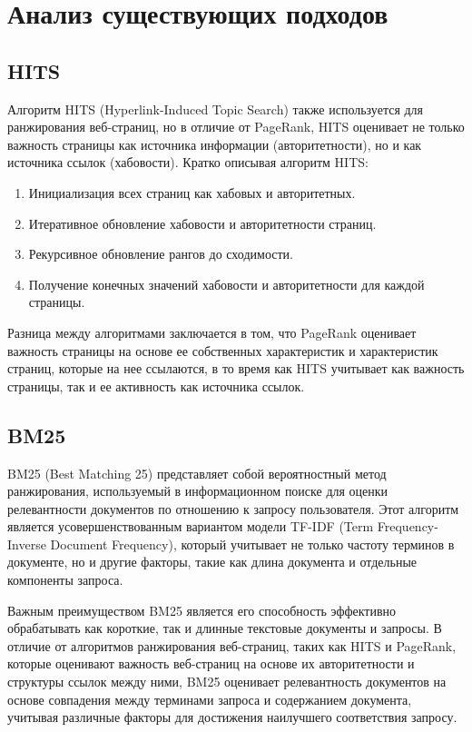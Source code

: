 \documentclass[a4paper]{article}
\begin{document}
	\section{Анализ существующих подходов}
	
	\subsection{HITS}
	
Алгоритм HITS (Hyperlink-Induced Topic Search) также используется для ранжирования веб-страниц, но в отличие от PageRank, HITS оценивает не только важность страницы как источника информации (авторитетности), но и как источника ссылок (хабовости). Кратко описывая алгоритм HITS:

\begin{enumerate}
	\item Инициализация всех страниц как хабовых и авторитетных.
	\item Итеративное обновление хабовости и авторитетности страниц.
	\item Рекурсивное обновление рангов до сходимости.
	\item Получение конечных значений хабовости и авторитетности для каждой страницы.
\end{enumerate}

Разница между алгоритмами заключается в том, что PageRank оценивает важность страницы на основе ее собственных характеристик и характеристик страниц, которые на нее ссылаются, в то время как HITS учитывает как важность страницы, так и ее активность как источника ссылок.

	\subsection{BM25}
	
BM25 (Best Matching 25) представляет собой вероятностный метод ранжирования, используемый в информационном поиске для оценки релевантности документов по отношению к запросу пользователя. Этот алгоритм является усовершенствованным вариантом модели TF-IDF (Term Frequency-Inverse Document Frequency), который учитывает не только частоту терминов в документе, но и другие факторы, такие как длина документа и отдельные компоненты запроса.

Важным преимуществом BM25 является его способность эффективно обрабатывать как короткие, так и длинные текстовые документы и запросы. В отличие от алгоритмов ранжирования веб-страниц, таких как HITS и PageRank, которые оценивают важность веб-страниц на основе их авторитетности и структуры ссылок между ними, BM25 оценивает релевантность документов на основе совпадения между терминами запроса и содержанием документа, учитывая различные факторы для достижения наилучшего соответствия запросу.
\end{document}
